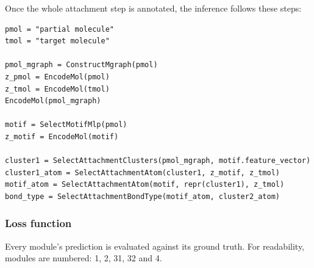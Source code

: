 \documentclass{article}
\begin{document}
Once the whole attachment step is annotated, the inference follows these steps:

\begin{lstlisting}
pmol = "partial molecule"
tmol = "target molecule"

pmol_mgraph = ConstructMgraph(pmol)
z_pmol = EncodeMol(pmol)
z_tmol = EncodeMol(tmol)
EncodeMol(pmol_mgraph)

motif = SelectMotifMlp(pmol)
z_motif = EncodeMol(motif)

cluster1 = SelectAttachmentClusters(pmol_mgraph, motif.feature_vector)
cluster1_atom = SelectAttachmentAtom(cluster1, z_motif, z_tmol)
motif_atom = SelectAttachmentAtom(motif, repr(cluster1), z_tmol)
bond_type = SelectAttachmentBondType(motif_atom, cluster2_atom)
\end{lstlisting}


\subsubsection{Loss function}

Every module's prediction is evaluated against its ground truth.
For readability, modules are numbered: 1, 2, 31, 32 and 4.
\end{document}
